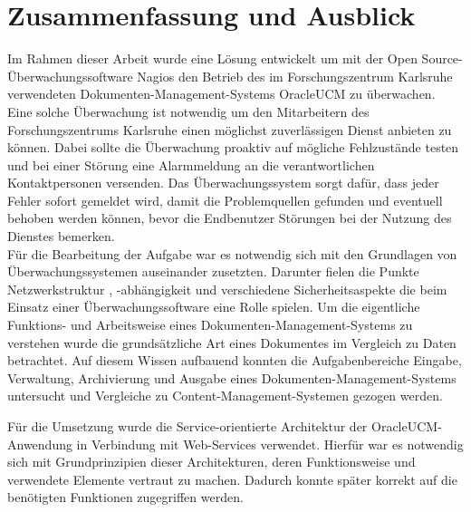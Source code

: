 \section{Zusammenfassung und Ausblick}

Im Rahmen dieser Arbeit wurde eine Lösung entwickelt um mit der Open Source-Überwachungssoftware Nagios den Betrieb des im Forschungszentrum Karlsruhe verwendeten Dokumenten-Management-Systems \gls{OracleUCM} zu überwachen.
Eine solche Überwachung ist notwendig um den Mitarbeitern des Forschungszentrums Karlsruhe einen möglichst zuverlässigen Dienst anbieten zu können.
Dabei sollte die Überwachung proaktiv auf mögliche Fehlzustände testen und bei einer Störung eine Alarmmeldung an die verantwortlichen Kontaktpersonen versenden. 
Das Überwachungssystem sorgt dafür, dass jeder Fehler sofort gemeldet wird, damit die Problemquellen gefunden und eventuell behoben werden können, bevor die Endbenutzer Störungen bei der Nutzung des Dienstes bemerken.\\

Für die Bearbeitung der Aufgabe war es notwendig sich mit den Grundlagen von Überwachungssystemen auseinander zusetzten.
Darunter fielen die Punkte Netzwerkstruktur , -abhängigkeit und verschiedene Sicherheitsaspekte die beim Einsatz einer Überwachungssoftware eine Rolle spielen.
Um die eigentliche Funktions- und Arbeitsweise eines Dokumenten-Management-Systems zu verstehen wurde die grundsätzliche Art eines Dokumentes im Vergleich zu Daten betrachtet.
Auf diesem Wissen aufbauend konnten die Aufgabenbereiche Eingabe, Verwaltung, Archivierung und Ausgabe eines Dokumenten-Management-Systems untersucht und Vergleiche zu Content-Management-Systemen gezogen werden.

Für die Umsetzung wurde die Service-orientierte Architektur der \gls{OracleUCM}-Anwendung in Verbindung mit Web-Services verwendet.
Hierfür war es notwendig sich mit Grundprinzipien dieser Architekturen, deren Funktionsweise und verwendete Elemente vertraut zu machen.
Dadurch konnte später korrekt auf die benötigten Funktionen zugegriffen werden.\\

